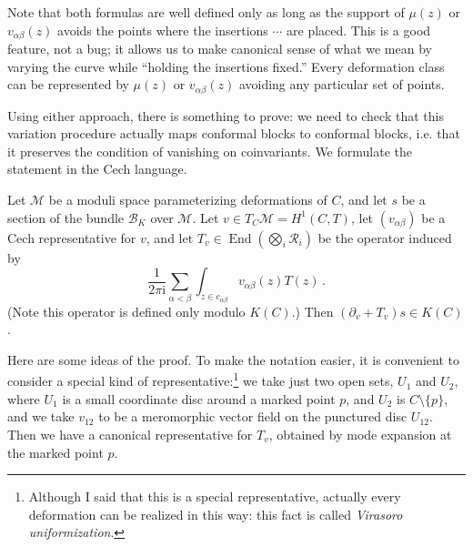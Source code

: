 \documentclass[12pt,letterpaper,reqno]{amsart}
\numberwithin{equation}{section}
\newcommand{\cB}{\ensuremath{\mathcal B}}
\newcommand{\cL}{\ensuremath{\mathcal L}}
\newcommand{\cM}{\ensuremath{\mathcal M}}
\newcommand{\I}{{\mathrm i}}
\newcommand{\vertex}{\mathcal{V}}
\newcommand{\vrep}{\mathcal{R}}
\newcommand{\tC}{{\widetilde C}}
\newcommand{\ti}[1]{\textit{#1}}
\DeclareMathOperator{\End}{End}
\DeclareRobustCommand{\fixme}[1]{\leavevmode{\color{orange}[#1]}}
\begin{document}
Note that both formulas are well defined only as long as 
the support of $\mu(z)$ or $v_{\alpha \beta}(z)$ avoids the points where the insertions $\cdots$ are placed.
This is a good feature, not a bug; it allows us to make canonical sense of what we mean by varying
the curve while ``holding the insertions fixed.'' Every deformation class can be 
represented by $\mu(z)$ or $v_{\alpha \beta}(z)$ 
avoiding any particular set of points.

Using either approach, there is something to prove: we need to check that this variation procedure actually maps conformal blocks to 
conformal blocks,
i.e. that it preserves the condition of vanishing on coinvariants. 
We formulate the statement in the Cech language.

\begin{prop}
Let $\cM$ be a moduli space parameterizing deformations of $C$,
and let $s$ be a section of the bundle $\cB_K$ over $\cM$.
Let $v \in T_C \cM = H^1(C,T)$,
let $(v_{\alpha \beta})$ be a Cech representative for $v$, 
and let $T_v \in \End (\bigotimes_i \vrep_i)$ be the operator induced by
\begin{equation}
  \frac{1}{2 \pi \I} \sum_{\alpha < \beta} \int_{z \in c_{\alpha \beta}} v_{\alpha \beta}(z) T(z) \, .
\end{equation}
(Note this operator is defined only modulo $K(C)$.)
Then $(\partial_v + T_v) s \in K(C)$.
\end{prop}

Here are some ideas of the proof.
To make the notation easier, it is convenient to consider a special kind of representative:\footnote{Although I said that this is a special representative, actually every deformation can be realized in this way: this fact is called \ti{Virasoro uniformization}.}
we take just two open sets, $U_1$ and $U_2$, where $U_1$ is a small coordinate disc around a marked
point $p$, and $U_2$ is $C \setminus \{ p \}$, and we take $v_{12}$ to be a meromorphic
vector field on the punctured disc $U_{12}$.
Then we have a canonical representative for $T_v$, obtained by mode expansion at 
the marked point $p$.
\end{document}

